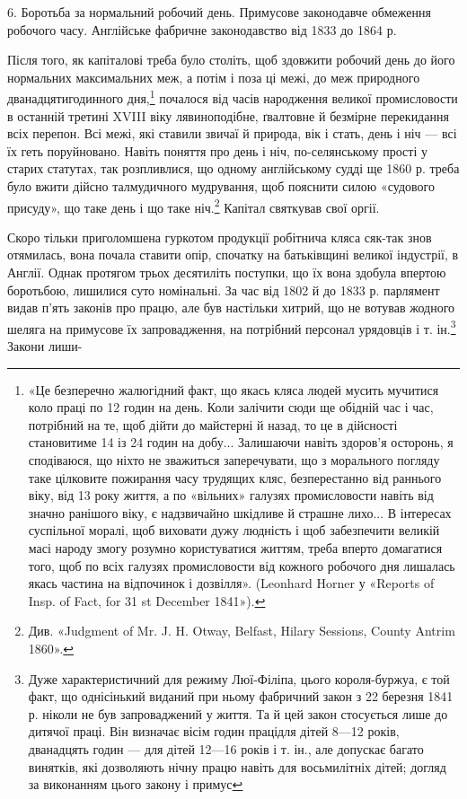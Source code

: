 6. Боротьба за нормальний робочий день. Примусове законодавче
обмеження робочого часу. Англійське фабричне законодавство
від 1833 до 1864 р.

Після того, як капіталові треба було століть, щоб здовжити
робочий день до його нормальних максимальних меж, а потім і
поза ці межі, до меж природного дванадцятигодинного дня,\footnote{
«Це безперечно жалюгідний факт, що якась кляса людей мусить
мучитися коло праці по 12 годин на день. Коли залічити сюди ще обідній
час і час, потрібний на те, щоб дійти до майстерні й назад, то це в дійсності
становитиме 14 із 24 годин на добу... Залишаючи навіть здоров’я осторонь,
я сподіваюся, що ніхто не зважиться заперечувати, що з морального
погляду таке цілковите пожирання часу трудящих кляс, безперестанно
від раннього віку, від 13 року життя, а по «вільних» галузях промисловости
навіть від значно ранішого віку, є надзвичайно шкідливе й страшне
лихо... В інтересах суспільної моралі, щоб виховати дужу людність
і щоб забезпечити великій масі народу змогу розумно користуватися
життям, треба вперто домагатися того, щоб по всіх галузях промисловости
від кожного робочого дня лишалась якась частина на відпочинок і дозвілля».
(Leonhard Horner у «Reports of Insp. of Fact, for 31 st December
1841»).
}
почалося від часів народження великої промисловости в останній
третині XVIII віку лявиноподібне, ґвалтовне й безмірне перекидання
всіх перепон. Всі межі, які ставили звичаї й природа,
вік і стать, день і ніч — всі їх геть поруйновано. Навіть поняття
про день і ніч, по-селянському прості у старих статутах, так
розпливлися, що одному англійському судді ще 1860 р. треба
було вжити дійсно талмудичного мудрування, щоб пояснити
силою «судового присуду», що таке день і що таке ніч.\footnote{
Див. «Judgment of Mr. J. H. Otway, Belfast, Hilary Sessions,
County Antrim 1860».
} Капітал
святкував свої оргії.

Скоро тільки приголомшена гуркотом продукції робітнича
кляса сяк-так знов отямилась, вона почала ставити опір, спочатку
на батьківщині великої індустрії, в Англії. Однак протягом
трьох десятиліть поступки, що їх вона здобула впертою боротьбою,
лишилися суто номінальні. За час від 1802 й до 1833 р.
парлямент видав п’ять законів про працю, але був настільки
хитрий, що не вотував жодного шеляга на примусове їх запровадження,
на потрібний персонал урядовців і т. ін.\footnote{
Дуже характеристичний для режиму Люї-Філіпа, цього короля-буржуа,
є той факт, що однісінький виданий при ньому фабричний
закон з 22 березня 1841 р. ніколи не був запроваджений у життя. Та й цей
закон стосується лише до дитячої праці. Він визначає вісім годин працідля
дітей 8—12 років, дванадцять годин — для дітей 12—16 років і
т. ін., але допускає багато винятків, які дозволяють нічну працю навіть
для восьмилітніх дітей; догляд за виконанням цього закону і примус
} Закони лиши-

